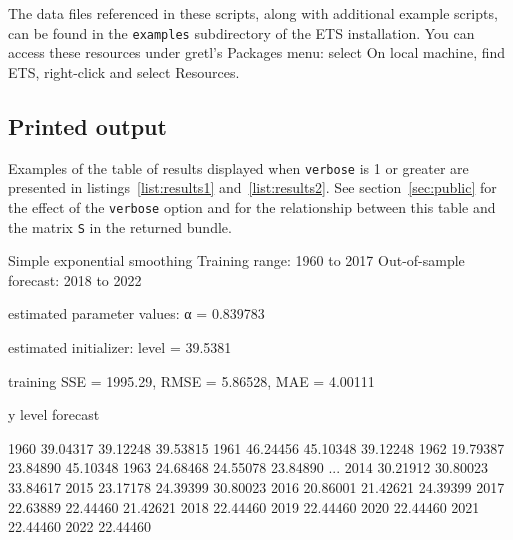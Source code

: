 \documentclass{article}
\begin{document}
The data files referenced in these scripts, along with additional
example scripts, can be found in the \texttt{examples} subdirectory of
the \textsf{ETS} installation. You can access these resources under
gretl's \textsf{Packages} menu: select \textsf{On local machine}, find
\textsf{ETS}, right-click and select \textsf{Resources}.

\subsection{Printed output}

Examples of the table of results displayed when \texttt{verbose} is 1 or
greater are presented in listings~\ref{list:results1}
and~\ref{list:results2}. See section~\ref{sec:public} for the effect of
the \texttt{verbose} option and for the relationship between this table
and the matrix \texttt{S} in the returned bundle.

\begin{script}[htbp]
  \caption{Partial listing of results from the simple exponential
    smoothing example in Section~\ref{sec:examples}.}
  \label{list:results1}
\begin{code}
Simple exponential smoothing
Training range: 1960 to 2017
Out-of-sample forecast: 2018 to 2022

estimated parameter values:
  α = 0.839783

estimated initializer:
  level = 39.5381

training SSE = 1995.29, RMSE = 5.86528, MAE = 4.00111

                y        level     forecast

1960     39.04317     39.12248     39.53815
1961     46.24456     45.10348     39.12248
1962     19.79387     23.84890     45.10348
1963     24.68468     24.55078     23.84890
...
2014     30.21912     30.80023     33.84617
2015     23.17178     24.39399     30.80023
2016     20.86001     21.42621     24.39399
2017     22.63889     22.44460     21.42621
2018                               22.44460
2019                               22.44460
2020                               22.44460
2021                               22.44460
2022                               22.44460
\end{code}
\end{script}
\end{document}
